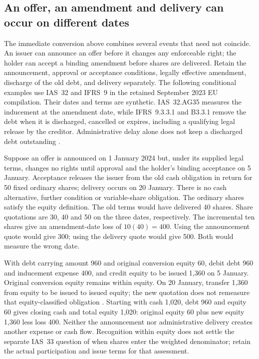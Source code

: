 \subsection{An offer, an amendment and delivery can occur on different dates}
\label{sec:financing-amendment-dates}

The immediate conversion above combines several events that need not coincide.
An issuer can announce an offer before it changes any enforceable right; the
holder can accept a binding amendment before shares are delivered. Retain the
announcement, approval or acceptance conditions, legally effective amendment,
discharge of the old debt, and delivery separately. The following conditional
examples use IAS~32 and IFRS~9 in the retained September 2023 EU compilation.
Their dates and terms are synthetic. IAS~32.AG35 measures the inducement at
the amendment date, while IFRS~9.3.3.1 and B3.3.1 remove the debt when it is
discharged, cancelled or expires, including a qualifying legal release by the
creditor. Administrative delay alone does not keep a discharged debt outstanding
\citep[IAS~32.13, AG35; IFRS~9.3.3.1--3, B3.3.1--6]{eu20231803}.

Suppose an offer is announced on 1 January 2024 but, under its supplied legal
terms, changes no rights until approval and the holder's binding acceptance on
5 January. Acceptance releases the issuer from the old cash obligation in
return for 50 fixed ordinary shares; delivery occurs on 20 January. There is no
cash alternative, further condition or variable-share obligation. The ordinary
shares satisfy the equity definition. The old terms would have delivered 40
shares. Share quotations are 30, 40 and 50 on the three dates, respectively.
The incremental ten shares give an amendment-date loss of $10(40)=400$.
Using the announcement quote would give 300; using the delivery quote would
give 500. Both would measure the wrong date.

With debt carrying amount 960 and original conversion equity 60, debit debt
960 and inducement expense 400, and credit equity to be issued 1,360 on
5 January. Original conversion equity remains within equity. On 20 January,
transfer 1,360 from equity to be issued to issued equity; the new quotation
does not remeasure that equity-classified obligation
\citep[IAS~32.15--16, 21--22, AG32--35]{eu20231803}.
Starting with cash 1,020, debt 960 and equity 60 gives closing cash and total
equity 1,020: original equity 60 plus new equity 1,360 less loss 400. Neither
the announcement nor administrative delivery creates another expense or cash
flow. Recognition within equity does not settle the separate IAS~33 question
of when shares enter the weighted denominator; retain the actual participation
and issue terms for that assessment.

